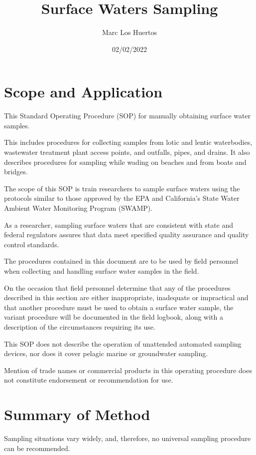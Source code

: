 \documentclass[12pt]{../SOP4_alpha}\usepackage[]{graphicx}\usepackage[]{xcolor}
\title{Surface Waters Sampling}
\date{02/02/2022}
\author{Marc Los Huertos}
\begin{document}
\maketitle

\section{Scope and Application}

\NP This Standard Operating Procedure (SOP) for manually obtaining surface water samples.  

\NP This includes procedures for collecting samples from lotic and lentic waterbodies, wastewater treatment plant access points, and outfalls, pipes, and drains. It also describes procedures for sampling while wading on beaches and from boats and bridges.

\NP The scope of this SOP is train researchers to sample surface waters using the protocols similar to those approved by the EPA and California's State Water Ambient Water Monitoring Program (SWAMP). 

\NP As a researcher, sampling surface waters that are consistent with state and federal regulators assures that data meet specified quality assurance and quality control standards.

\NP The procedures contained in this document are to be used by field personnel when collecting and handling surface water samples in the field.  

\NP On the occasion that field personnel determine that any of the procedures described in this section are either inappropriate, inadequate or impractical and that another procedure must be used to obtain a surface water sample, the variant procedure will be documented in the field logbook, along with a description of the circumstances requiring its use.  

\NP  This SOP does not describe the operation of unattended automated sampling devices, nor does it cover pelagic marine or groundwater sampling. 

\NP Mention of trade names or commercial products in this operating procedure does not constitute endorsement or recommendation for use.

\section{Summary of Method}

Sampling situations vary widely, and, therefore, no universal sampling procedure can be
recommended.
\end{document}
